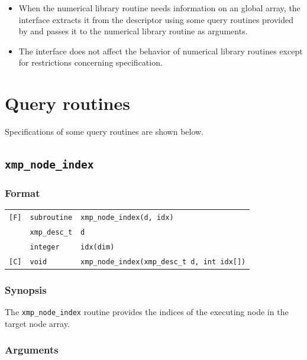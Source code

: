 \begin{itemize}
 \item When the numerical library routine needs information on an global
       array, the interface extracts it from the descriptor using some
       query routines provided by {\XMP} and passes it to the
       numerical library routine as arguments.
%
 \item The interface does not affect the behavior of numerical library
       routines except for restrictions concerning {\XMP} specification.
\end{itemize}


\section{Query routines}

Specifications of some query routines are shown below.

\subsection{\tt xmp\_node\_index}

\subsubsection*{Format}

\begin{tabular}{lll}

\verb![F]!& {\tt subroutine}& {\tt xmp\_node\_index(d, idx)}\\
          & {\tt xmp\_desc\_t} & {\tt d}\\
          & {\tt integer} & {\tt idx(dim)}\\

\verb![C]!&  {\tt void}& {\tt xmp\_node\_index(xmp\_desc\_t d, int idx[])}\\

\end{tabular}

\subsubsection*{Synopsis}

The {\tt xmp\_node\_index} routine provides the indices of the
executing node in the target node array.

\subsubsection*{Arguments}

